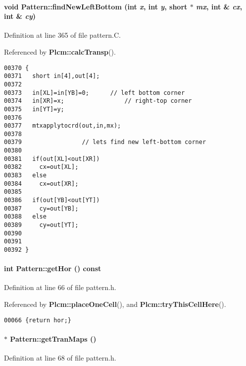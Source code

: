\paragraph{\setlength{\rightskip}{0pt plus 5cm}void Pattern::find\-New\-Left\-Bottom (int {\em x}, int {\em y}, short $\ast$ {\em mx}, int \& {\em cx}, int \& {\em cy})}\hfill



Definition at line 365 of file pattern.C.

Referenced by {\bf Plcm::calc\-Transp}().\small\begin{verbatim}00370 {
00371   short in[4],out[4];
00372   
00373   in[XL]=in[YB]=0;      // left bottom corner
00374   in[XR]=x;                 // right-top corner
00375   in[YT]=y;
00376   
00377   mtxapplytocrd(out,in,mx);
00378   
00379                 // lets find new left-bottom corner
00380   
00381   if(out[XL]<out[XR])
00382     cx=out[XL];
00383   else
00384     cx=out[XR];
00385   
00386   if(out[YB]<out[YT])
00387     cy=out[YB];
00388   else
00389     cy=out[YT];
00390   
00391   
00392 }
\end{verbatim}\normalsize 
\label{Pattern_a9}
\paragraph{\setlength{\rightskip}{0pt plus 5cm}int Pattern::get\-Hor () const\hspace{0.3cm}{\tt  [inline]}}\hfill



Definition at line 66 of file pattern.h.

Referenced by {\bf Plcm::place\-One\-Cell}(), and {\bf Plcm::try\-This\-Cell\-Here}().\small\begin{verbatim}00066 {return hor;}
\end{verbatim}\normalsize 
\label{Pattern_a11}
\paragraph{ $\ast$ Pattern::get\-Tran\-Maps ()\hspace{0.3cm}{\tt  [inline]}}\hfill



Definition at line 68 of file pattern.h.

